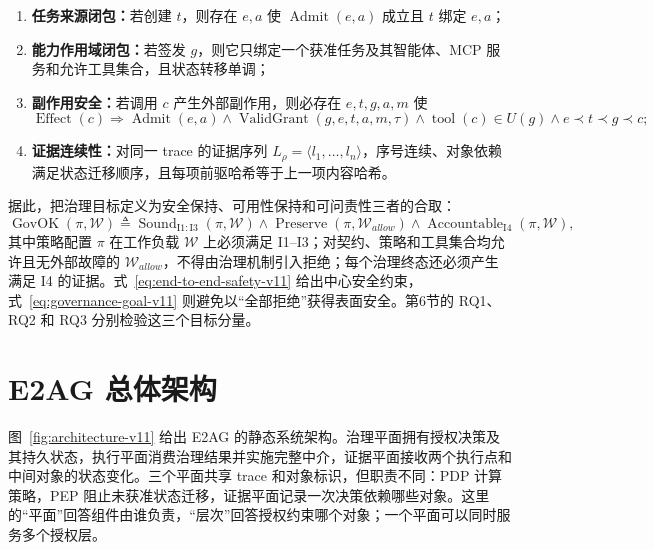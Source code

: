 \begin{enumerate}[label=I\arabic*.]
  \item \textbf{任务来源闭包：}若创建 $t$，则存在 $e,a$ 使 $\operatorname{Admit}(e,a)$ 成立且 $t$ 绑定 $e,a$；
  \item \textbf{能力作用域闭包：}若签发 $g$，则它只绑定一个获准任务及其智能体、MCP 服务和允许工具集合，且状态转移单调；
  \item \textbf{副作用安全：}若调用 $c$ 产生外部副作用，则必存在 $e,t,g,a,m$ 使
  \begin{equation}
  \operatorname{Effect}(c)\Rightarrow
  \operatorname{Admit}(e,a)\land
  \operatorname{ValidGrant}(g,e,t,a,m,\tau)\land
  \operatorname{tool}(c)\in U(g)\land e\prec t\prec g\prec c;
  \label{eq:end-to-end-safety-v11}
  \end{equation}
  \item \textbf{证据连续性：}对同一 trace 的证据序列 $L_\rho=\langle l_1,\ldots,l_n\rangle$，序号连续、对象依赖满足状态迁移顺序，且每项前驱哈希等于上一项内容哈希。
\end{enumerate}

据此，把治理目标定义为安全保持、可用性保持和可问责性三者的合取：
\begin{equation}
\operatorname{GovOK}(\pi,\mathcal{W})\triangleq
\operatorname{Sound}_{\mathrm{I1:I3}}(\pi,\mathcal{W})\land
\operatorname{Preserve}(\pi,\mathcal{W}_{allow})\land
\operatorname{Accountable}_{\mathrm{I4}}(\pi,\mathcal{W}),
\label{eq:governance-goal-v11}
\end{equation}
其中策略配置 $\pi$ 在工作负载 $\mathcal{W}$ 上必须满足 I1--I3；对契约、策略和工具集合均允许且无外部故障的 $\mathcal{W}_{allow}$，不得由治理机制引入拒绝；每个治理终态还必须产生满足 I4 的证据。式~\eqref{eq:end-to-end-safety-v11} 给出中心安全约束，式~\eqref{eq:governance-goal-v11} 则避免以“全部拒绝”获得表面安全。第6节的 RQ1、RQ2 和 RQ3 分别检验这三个目标分量。

\section{E2AG 总体架构}\label{sec:architecture-v11}



图~\ref{fig:architecture-v11} 给出 E2AG 的静态系统架构。治理平面拥有授权决策及其持久状态，执行平面消费治理结果并实施完整中介，证据平面接收两个执行点和中间对象的状态变化。三个平面共享 trace 和对象标识，但职责不同：PDP 计算策略，PEP 阻止未获准状态迁移，证据平面记录一次决策依赖哪些对象。这里的“平面”回答组件由谁负责，“层次”回答授权约束哪个对象；一个平面可以同时服务多个授权层。

